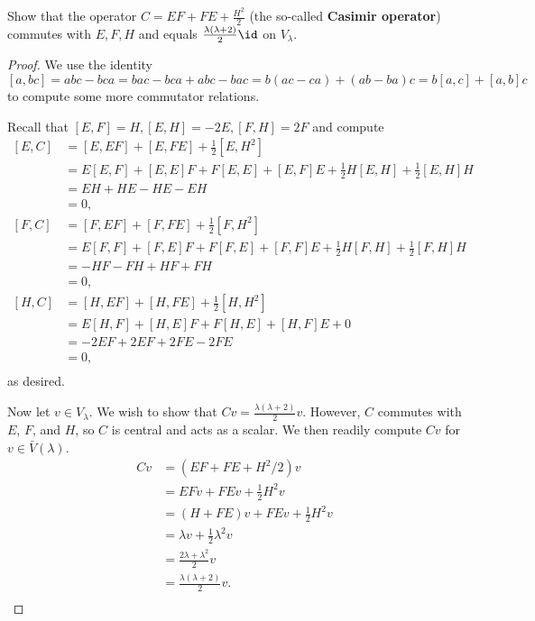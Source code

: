 \documentclass{article}
\begin{document}
\begin{prop}
Show that the operator $C = EF + FE + \frac{H^2}{2}$ (the so-called
\textbf{Casimir operator}) commutes with $E, F, H$ and equals $\frac{\lambda
(\lambda + 2)}{2} \id$ on $V_{\lambda}$.
\end{prop}

\begin{proof}
We use the identity
\[ [a, bc] = abc - bca = bac - bca + abc - bac = b(ac - ca) + (ab - ba)c = b[a,
c] + [a, b]c \]
to compute some more commutator relations.

Recall that $[E, F] = H, [E, H] = -2E, [F, H] = 2F$ and compute
\[ \begin{aligned}
[E, C] &= [E, EF] + [E, FE] + \frac{1}{2} [E, H^2] \\
&= E [E, F] + [E, E] F + F [E, E] + [E, F] E + \frac{1}{2} H [E, H] +
\frac{1}{2} [E, H] H \\
&= EH + HE - HE - EH \\
&= 0, \\
[F, C] &= [F, EF] + [F, FE] + \frac{1}{2} [F, H^2] \\
&= E [F, F] + [F, E] F + F [F, E] + [F, F] E + \frac{1}{2} H [F, H] +
\frac{1}{2} [F, H] H \\
&= -HF - FH + HF + FH \\
&= 0, \\
[H, C] &= [H, EF] + [H, FE] + \frac{1}{2} [H, H^2] \\
&= E [H, F] + [H, E] F + F [H, E] + [H, F] E + 0 \\
&= -2EF + 2EF + 2FE - 2FE \\
&= 0, \\
\end{aligned} \]
as desired.

Now let $v \in V_{\lambda}$. We wish to show that $Cv = \frac{\lambda (\lambda +
2)}{2} v$. However, $C$ commutes with $E$, $F$, and $H$, so $C$ is central and
acts as a scalar. We then readily compute $Cv$ for $v \in \bar{V}(\lambda)$.
\[ \begin{aligned}
Cv &= (EF + FE + H^2 / 2) v \\
&= EF v + FE v + \frac{1}{2} H^2 v \\
&= (H + FE) v + FE v + \frac{1}{2} H^2 v \\
&= \lambda v + \frac{1}{2} \lambda^2 v \\
&= \frac{2 \lambda + \lambda^2}{2} v \\
&= \frac{\lambda (\lambda + 2)}{2} v. \\
\end{aligned} \]
\end{proof}
\end{document}
